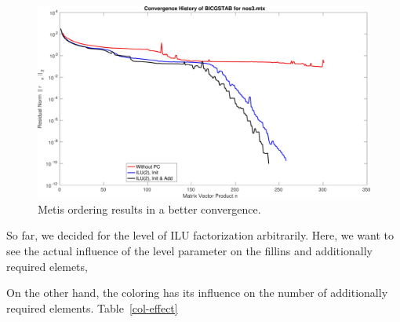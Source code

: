 \documentclass[12pt, oneside]{book}
\begin{document}
\begin{figure}
\includegraphics[width=\linewidth]{nos3_mtx_convergence_metis}
\caption{Metis ordering results in a better convergence.}
\label{metis_convergence}
\end{figure}

So far, we decided for the level of ILU factorization arbitrarily.
Here, we want to see the actual influence of the level parameter on
the fillins and additionally required elemets,



On the other hand, the coloring has its influence on the number of 
additionally required elements. Table~\ref{col-effect}
\end{document}
